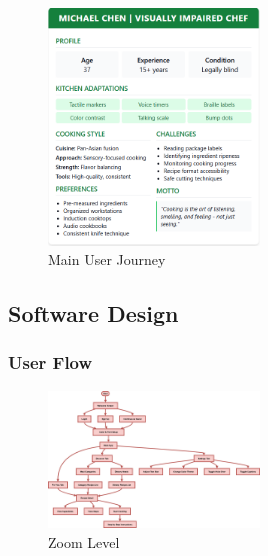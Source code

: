 \documentclass[]{project_final}
\begin{document}
\begin{figure}[ht!]
    \centering
    \includegraphics[width=0.5\textwidth]{visuallyim.png}
    \vspace*{0.0cm}
    \caption{Main User Journey}
    \label{fig:1}
\end{figure}
\subsection{Software Design}
\subsubsection{User Flow}

\begin{figure}[ht!]
    \centering
    \includegraphics[width=0.5\textwidth]{MRAuserflow.png}
    \vspace*{0.0cm}
    \caption{Zoom Level}
    \label{fig:1}
\end{figure}
\newpage
\end{document}
